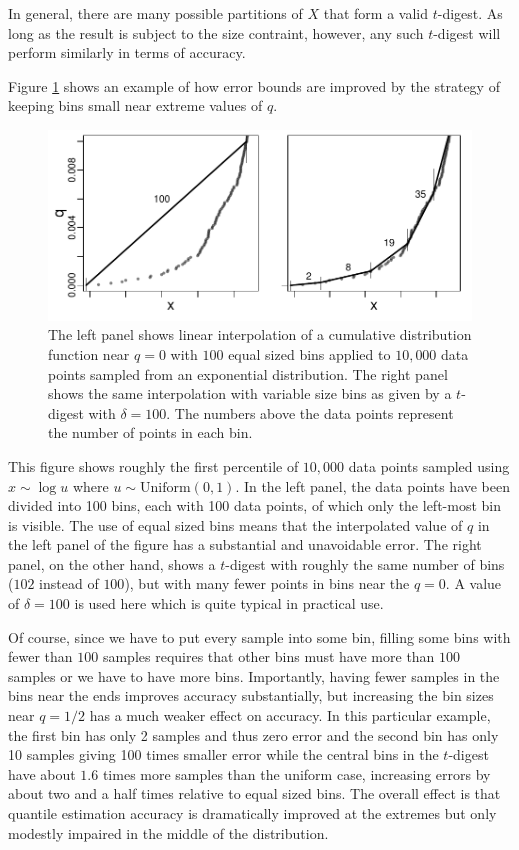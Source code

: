 \documentclass[11pt]{amsart}
\begin{document}
In general, there are many possible partitions of $X$ that form a valid $t$-digest. As long as the result is subject to the size contraint, however, any such $t$-digest will perform similarly in terms of accuracy.

Figure \ref{fig:linear-interpolation} shows an example of how error bounds are improved by the strategy of keeping bins small near extreme values of $q$. 

\begin{figure}[h] %
   \centering
   \includegraphics[height=2.in, clip]{linear-interpolation.pdf} 
   \caption{The left panel shows linear interpolation of a cumulative distribution function near $q=0$ with $100$ equal sized bins applied to $10,000$ data points sampled from an exponential distribution. The right panel shows the same interpolation with variable size bins as given by a $t$-digest with $\delta=100$. The numbers above the data points represent the number of points in each bin. }
   \label{fig:linear-interpolation}
\end{figure}
This figure shows roughly the first percentile of $10,000$ data points sampled using $x \sim \log u$ where $u \sim \mathrm{Uniform}(0,1)$. In the left panel, the data points have been divided into 100 bins, each with 100 data points, of which only the left-most bin is visible. The use of equal sized bins means that the interpolated value of $q$ in the left panel of the figure has a substantial and unavoidable error. The right panel, on the other hand, shows a $t$-digest with roughly the same number of bins ($102$ instead of $100$), but with many fewer points in bins near the $q=0$. A value of $\delta=100$ is used here which is quite typical in practical use. 

Of course, since we have to put every sample into some bin, filling some bins with fewer than $100$ samples requires that other bins must have more than $100$ samples or we have to have more bins. Importantly, having fewer samples in the bins near the ends improves accuracy substantially, but increasing the bin sizes near $q=1/2$ has a much weaker effect on accuracy. In this particular example, the first bin has only 2 samples and thus zero error and the second bin has only 10 samples giving 100 times smaller error while the central bins in the $t$-digest have about $1.6$ times more samples than the uniform case, increasing errors by about two and a half times relative to equal sized bins. The overall effect is that quantile estimation accuracy is dramatically improved at the extremes but only modestly impaired in the middle of the distribution.
\end{document}
